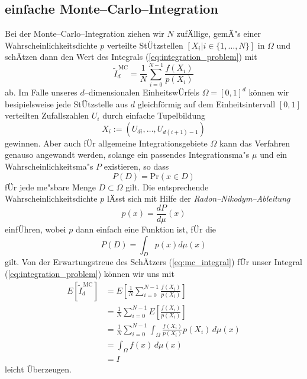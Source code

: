 	\subsection{einfache Monte--Carlo--Integration}
	Bei der Monte--Carlo--Integration ziehen wir $N$ zufÄllige, gemÄ"s einer Wahrscheinlichkeitsdichte $p$ verteilte StÜtzstellen $[X_i|i\in\{1,\dots,N\}]$ in $\Omega$ und schÄtzen dann den Wert des Integrals (\ref{eq:integration_problem}) mit
	\begin{equation}
		{\tilde I}_d^{\,\text{MC}}=\frac{1}{N}\sum_{i=0}^{N-1} \frac{f(X_i)}{p(X_i)}
		\label{eq:mc_integral}
	\end{equation}
	ab. Im Falle unseres $d$--dimensionalen EinheitswÜrfels $\Omega=[0,1]^d$ können wir besipielsweise jede StÜtzstelle aus $d$ gleichförmig auf dem Einheitsintervall $[0,1]$ verteilten Zufallszahlen $U_i$ durch einfache Tupelbildung
	$$X_i:=(U_{d i},\dots,U_{d(i+1)-1})$$
	gewinnen. Aber auch fÜr allgemeine Integrationsgebiete $\Omega$ kann das Verfahren genauso angewandt werden, solange ein passendes Integrationsma"s $\mu$ und ein Wahrscheinlichkeitsma"s $P$ existieren, so dass $$P(D)=\text{Pr}(x\in D)$$ fÜr jede me"sbare Menge $D\subset\Omega$ gilt. Die entsprechende Wahrscheinlichkeitsdichte $p$ lÄsst sich mit Hilfe der {\em Radon--Nikodym--Ableitung} $$p(x)=\frac{dP}{d\mu}(x)$$
	einfÜhren, wobei $p$ dann einfach eine Funktion ist, fÜr die $$P(D)=\int_D p(x)d\mu(x)$$ gilt.
	Von der Erwartungstreue des SchÄtzers (\ref{eq:mc_integral}) fÜr unser Integral (\ref{eq:integration_problem}) können wir uns mit \citep[][2.4]{Veach:1997p9136}
	\begin{align*}
		E[{\tilde I}_d^{\,\text{MC}}] &=E\left[\frac{1}{N}\sum_{i=0}^{N-1}\frac{f(X_i)}{p(X_i)}\right] \\
			&= \frac{1}{N}\sum_{i=0}^{N-1}E\left[\frac{f(X_i)}{p(X_i)}\right] \\
			&= \frac{1}{N}\sum_{i=0}^{N-1}\int_\Omega \frac{f(X_i)}{p(X_i)}p(X_i)\,d\mu(x) \\
			&= \int_\Omega f(x)\,d\mu(x)\\
			&= I
	\end{align*}
	leicht Überzeugen.
	
